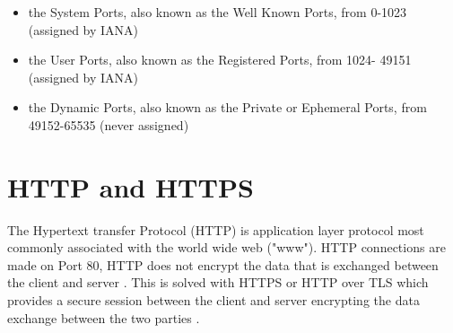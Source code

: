 \documentclass[a4wide,leqno,12pt]{report}
\begin{document}
\begin{itemize}
\item the System Ports, also known as the Well Known Ports, from 0-1023
      (assigned by IANA)
\item the User Ports, also known as the Registered Ports, from 1024-
      49151 (assigned by IANA)
\item the Dynamic Ports, also known as the Private or Ephemeral Ports,
      from 49152-65535 (never assigned)
\end{itemize}
\section{HTTP and HTTPS}
The Hypertext transfer Protocol (HTTP) is application layer protocol most commonly associated with the world wide web ("www"). HTTP connections are made on Port 80, HTTP does not encrypt the data that is exchanged between the client and server \cite{fielding1999hypertext}. This is solved with HTTPS or HTTP over TLS which provides a secure session between the client and server encrypting the data exchange between the two parties \cite{rescorla2000http}. 
\end{document}
